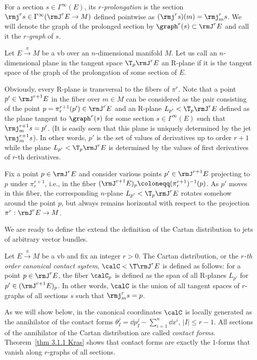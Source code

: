 For a section $s\in \Gamma^\infty(E)$, its \emph{$r$-prolongation} is the section $\rmj^r s\in \Gamma^\infty(\rmJ^rE\to M)$ defined pointwise as $(\rmj^r s)(m)=\rmj_m^r s$. We will denote the graph of the prolonged section by $\graph^r(s)\subset \rmJ^rE$ and call it the \emph{$r$-graph} of $s$.

\begin{defn}[R-plane]
    Let $E\overset{\pi}{\to}M$ be a \gls{vb} over an $n$-dimensional manifold $M$. Let us call an $n$-dimensional plane in the tangent space $\T_p \rmJ^rE$ an R-plane if it is the tangent space of the graph of the prolongation of some section of $E$.
\end{defn}

Obviously, every R-plane is transversal to the fibers of $\pi^r$. Note that a point $p'\in \rmJ^{r+1}E$ in the fiber over $m\in M$ can be considered as the pair consisting of the point $p=\pi^{r+1}_r(p')\in \rmJ^rE$ and an R-plane $L_{p'}<\T_p \rmJ^rE$ defined as the plane tangent to $\graph^r(s)$ for some section $s\in\Gamma^\infty(E)$ such that $\rmj^{r+1}_m s=p'$. (It is easily seen that this plane is uniquely determined by the jet $\rmj^{r+1}_m s$). In other words, $p'$ is the set of values of derivatives up to order $r+1$ while the plane $L_{p'}<\T_p \rmJ^rE$ is determined by the values of first derivatives of $r$-th derivatives.

Fix a point $p\in \rmJ^rE$ and consider various points $p'\in \rmJ^{r+1}E$ projecting to $p$ under $\pi^{r+1}_r$, i.e., in the fiber $(\rmJ^{r+1}E)_p\coloneqq (\pi^{r+1}_r)^{-1}(p)$. As $p'$ moves in this fiber, the corresponding $n$-plane $L_{p'}<\T_p\rmJ^rE$ rotates somehow around the point $p$, but always remains horizontal with respect to the projection $\pi^r:\rmJ^rE\to M$.

We are ready to define the extend the definition of the Cartan distribution to jets of arbitrary vector bundles.

\begin{defn}
    Let $E\overset{\pi}{\to} M$ be a \gls{vb} and fix an integer $r>0$. The Cartan distribution, or the \emph{$r$-th order canonical contact system}, $\calC<\T \rmJ^rE$ is defined as follows: for a point $p\in \rmJ^rE$, the fiber $\calC_p$ is defined as the span of all R-planes $L_{p'}$ for $p'\in (\rmJ^{r+1}E)_p$. In other words, $\calC$ is the union of all tangent spaces of $r$-graphs of all sections $s$ such that $\rmj^r_m s=p$.

    As we will show below, in the canonical coordinates $\calC$ is locally generated as the annihilator of the contact forms $\theta^j_I=\dd p^j_I-\sum_{i=1}^n \dd x^i$, $|I|\leq r-1$. All sections of the annihilator of the Cartan distribution are called \emph{contact forms}. Theorem~\ref{thm 3.1.1 Kras} shows that contact forms are exactly the $1$-forms that vanish along $r$-graphs of all sections.
\end{defn}

